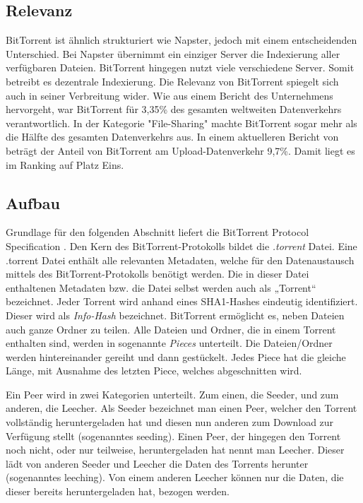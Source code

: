 \subsection{Relevanz}
BitTorrent ist ähnlich strukturiert wie Napster, jedoch mit einem entscheidenden Unterschied. Bei Napster übernimmt ein einziger Server die Indexierung aller verfügbaren Dateien. BitTorrent hingegen nutzt viele verschiedene Server. Somit betreibt es dezentrale Indexierung. 
Die Relevanz von BitTorrent spiegelt sich auch in seiner Verbreitung wider. Wie aus einem Bericht des Unternehmens \textcite{BitTorrentTrafficPaloalto} hervorgeht, war BitTorrent für 3,35\% des gesamten weltweiten Datenverkehrs verantwortlich. In der Kategorie "File-Sharing" machte BitTorrent sogar mehr als die Hälfte des gesamten Datenverkehrs aus. In einem aktuelleren Bericht von \textcite{BitTorrentTrafficSandvine} beträgt der Anteil von BitTorrent am Upload-Datenverkehr 9,7\%. Damit liegt es im Ranking auf Platz Eins. 

\subsection{Aufbau}
\label{sec:BitTorrentAufbau}
Grundlage für den folgenden Abschnitt liefert die BitTorrent Protocol Specification \parencite{BitTorrentSpecification}. 
Den Kern des BitTorrent-Protokolls bildet die \emph{.torrent} Datei. Eine .torrent Datei enthält alle relevanten Metadaten, welche für den Datenaustausch
mittels des BitTorrent-Protokolls benötigt werden. Die in dieser Datei enthaltenen Metadaten bzw. die Datei selbst werden auch als „Torrent“ bezeichnet. Jeder Torrent wird anhand eines SHA1-Hashes eindeutig identifiziert. Dieser wird als \emph{Info-Hash} bezeichnet. BitTorrent ermöglicht es, neben Dateien auch ganze Ordner zu teilen. Alle Dateien und Ordner, die in einem Torrent enthalten sind, werden in sogenannte \emph{Pieces} unterteilt. Die Dateien/Ordner werden hintereinander gereiht und dann gestückelt. Jedes Piece hat die gleiche Länge, mit Ausnahme des letzten Piece, welches abgeschnitten wird. 

Ein Peer wird in zwei Kategorien unterteilt. Zum einen, die Seeder, und zum anderen, die Leecher. Als Seeder bezeichnet man einen Peer, welcher den Torrent vollständig heruntergeladen hat und diesen nun anderen zum Download zur Verfügung stellt (sogenanntes seeding). Einen Peer, der hingegen den Torrent noch nicht, oder nur teilweise, heruntergeladen hat nennt man Leecher. Dieser lädt von anderen Seeder und Leecher die Daten des Torrents herunter (sogenanntes leeching). Von einem anderen Leecher können nur die Daten, die dieser bereits heruntergeladen hat, bezogen werden. 

